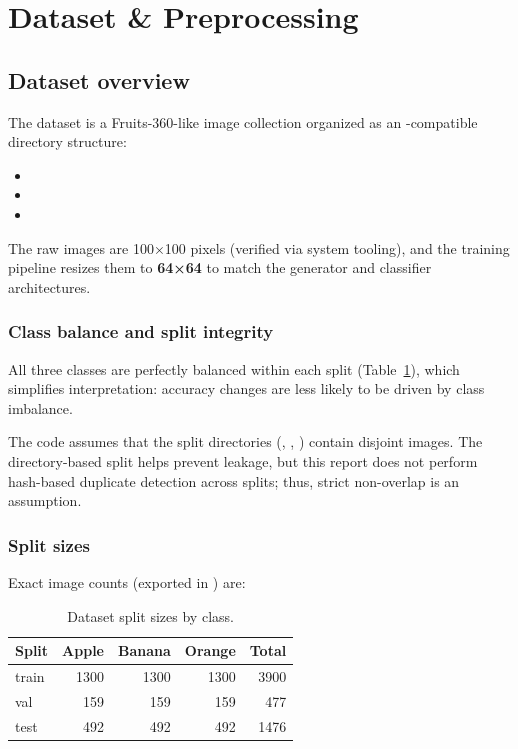 \section{Dataset \& Preprocessing}

\subsection{Dataset overview}

The dataset is a Fruits-360-like image collection organized as an -compatible directory structure:
\begin{itemize}
\item {}
\item {}
\item {}
\end{itemize}

The raw images are 100×100 pixels (verified via system tooling), and the training pipeline resizes them to \textbf{64×64} to match the generator and classifier architectures.

\subsubsection{Class balance and split integrity}

All three classes are perfectly balanced within each split (Table~\ref{tab:dataset-split-sizes}), which simplifies interpretation: accuracy changes are less likely to be driven by class imbalance.

The code assumes that the split directories (, , ) contain disjoint images. The directory-based split helps prevent leakage, but this report does not perform hash-based duplicate detection across splits; thus, strict non-overlap is an assumption.

\subsubsection{Split sizes}

Exact image counts (exported in ) are:

\begin{table}[H]
\centering
\caption{Dataset split sizes by class.}
\label{tab:dataset-split-sizes}
\begin{tabular}{@{}lrrrr@{}}
\toprule
Split & Apple & Banana & Orange & Total \\
\midrule
train & 1300 & 1300 & 1300 & 3900 \\
val & 159 & 159 & 159 & 477 \\
test & 492 & 492 & 492 & 1476 \\
\bottomrule
\end{tabular}
\end{table}

